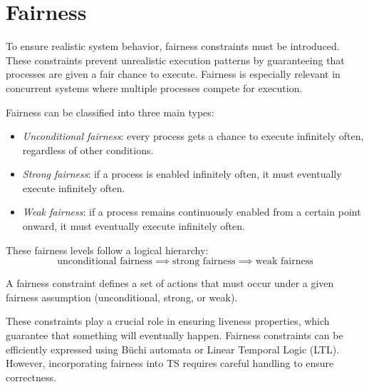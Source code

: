 \section{Fairness}

To ensure realistic system behavior, fairness constraints must be introduced. 
These constraints prevent unrealistic execution patterns by guaranteeing that processes are given a fair chance to execute. 
Fairness is especially relevant in concurrent systems where multiple processes compete for execution.

Fairness can be classified into three main types:
\begin{itemize}
    \item \textit{Unconditional fairness}: every process gets a chance to execute infinitely often, regardless of other conditions.
    \item \textit{Strong fairness}: if a process is enabled infinitely often, it must eventually execute infinitely often.
    \item \textit{Weak fairness}: if a process remains continuously enabled from a certain point onward, it must eventually execute infinitely often.
\end{itemize}
\noindent These fairness levels follow a logical hierarchy:
\[\text{unconditional fairness}\implies\text{strong fairness}\implies\text{weak fairness}\]

\begin{definition}
    A fairness constraint defines a set of actions that must occur under a given fairness assumption (unconditional, strong, or weak).
\end{definition}
\noindent These constraints play a crucial role in ensuring liveness properties, which guarantee that something will eventually happen.
Fairness constraints can be efficiently expressed using Büchi automata or Linear Temporal Logic (LTL). 
However, incorporating fairness into TS requires careful handling to ensure correctness.

